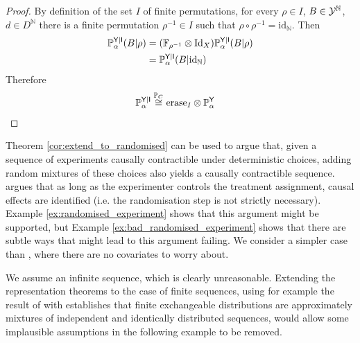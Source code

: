 \begin{proof}
By definition of the set $I$ of finite permutations, for every $\rho\in I$, $B\in\mathcal{Y}^{\mathbb{N}}$, $d\in D^{\mathbb{N}}$ there is a finite permutation $\rho^{-1}\in I$ such that $\rho\circ\rho^{-1}=\text{id}_{\mathbb{N}}$. Then
\begin{align}
    \mathbb{P}_\alpha^{\mathsf{Y}|\mathsf{I}}(B|\rho) &= (\mathbb{F}_{\rho^{-1}}\otimes \text{Id}_X )\mathbb{P}_\alpha^{\mathsf{Y}|\mathsf{I}}(B|\rho)\\
    &= \mathbb{P}_\alpha^{\mathsf{Y}|\mathsf{I}}(B|\text{id}_{\mathbb{N}})
\end{align}
Therefore
\begin{align}
    \mathbb{P}_\alpha^{\mathsf{Y}|\mathsf{I}} &\overset{\mathbb{P}_C}{\cong} \text{erase}_{I}\otimes \mathbb{P}_\alpha^{\mathsf{Y}}
\end{align}
\end{proof}

Theorem \ref{cor:extend_to_randomised} can be used to argue that, given a sequence of experiments causally contractible under deterministic choices, adding random mixtures of these choices also yields a causally contractible sequence. \citet{kasy_why_2016} argues that as long as the experimenter controls the treatment assignment, causal effects are identified (i.e. the randomisation step is not strictly necessary). Example \ref{ex:randomised_experiment} shows that this argument might be supported, but Example \ref{ex:bad_randomised_experiment} shows that there are subtle ways that might lead to this argument failing. We consider a simpler case than \citet{kasy_why_2016}, where there are no covariates to worry about.

We assume an infinite sequence, which is clearly unreasonable. Extending the representation theorems to the case of finite sequences, using for example the result of \citet{diaconis_finite_1980} with establishes that finite exchangeable distributions are approximately mixtures of independent and identically distributed sequences, would allow some implausible assumptions in the following example to be removed.

